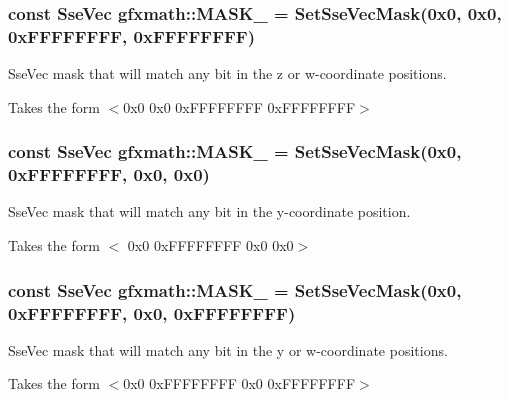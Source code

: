 \subsubsection[{M\+A\+S\+K\+\_\+0011}]{\setlength{\rightskip}{0pt plus 5cm}const {\bf Sse\+Vec} gfxmath\+::\+M\+A\+S\+K\+\_ = {\bf Set\+Sse\+Vec\+Mask}(0x0, 0x0, 0x\+F\+F\+F\+F\+F\+F\+F\+F, 0x\+F\+F\+F\+F\+F\+F\+F\+F)}\label{namespacegfxmath_ab0a1cad00f30a2a2967afd4076b70d14}


Sse\+Vec mask that will match any bit in the z or w-\/coordinate positions. 

Takes the form $<$0x0 0x0 0x\+F\+F\+F\+F\+F\+F\+F\+F 0x\+F\+F\+F\+F\+F\+F\+F\+F$>$ \hypertarget{namespacegfxmath_a2e6aab98443e9d5e2fe4270a1ed690ea}{}
\subsubsection[{M\+A\+S\+K\+\_\+0100}]{\setlength{\rightskip}{0pt plus 5cm}const {\bf Sse\+Vec} gfxmath\+::\+M\+A\+S\+K\+\_ = {\bf Set\+Sse\+Vec\+Mask}(0x0, 0x\+F\+F\+F\+F\+F\+F\+F\+F, 0x0, 0x0)}\label{namespacegfxmath_a2e6aab98443e9d5e2fe4270a1ed690ea}


Sse\+Vec mask that will match any bit in the y-\/coordinate position. 

Takes the form $<$ 0x0 0x\+F\+F\+F\+F\+F\+F\+F\+F 0x0 0x0$>$ \hypertarget{namespacegfxmath_ab4dafd60d94026a9b0a4ff0593680a25}{}
\subsubsection[{M\+A\+S\+K\+\_\+0101}]{\setlength{\rightskip}{0pt plus 5cm}const {\bf Sse\+Vec} gfxmath\+::\+M\+A\+S\+K\+\_ = {\bf Set\+Sse\+Vec\+Mask}(0x0, 0x\+F\+F\+F\+F\+F\+F\+F\+F, 0x0, 0x\+F\+F\+F\+F\+F\+F\+F\+F)}\label{namespacegfxmath_ab4dafd60d94026a9b0a4ff0593680a25}


Sse\+Vec mask that will match any bit in the y or w-\/coordinate positions. 

Takes the form $<$0x0 0x\+F\+F\+F\+F\+F\+F\+F\+F 0x0 0x\+F\+F\+F\+F\+F\+F\+F\+F$>$ \hypertarget{namespacegfxmath_a0a4b2297562ec2a6515260a20caca407}{}
